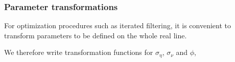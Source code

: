\documentclass{beamer}
\begin{document}
\begin{frame}[fragile]

\begin{knitrout}\small
{}\color{fgcolor}\begin{kframe}
\begin{alltt}
 \hlkwb{<-} 
\end{alltt}
\end{kframe}
\end{knitrout}

\begin{knitrout}\small
{}\color{fgcolor}\begin{kframe}
\begin{alltt}
 \hlkwb{<-} 

 \hlkwb{<-} 
\end{alltt}
\end{kframe}
\end{knitrout}


\end{frame}

\begin{frame}[fragile]

\frametitle{Parameter transformations}

\bi

\item For optimization procedures such as iterated filtering, it is convenient to transform parameters to be defined on the whole real line. 

\item We therefore write transformation functions for $\sigma_\eta$, $\sigma_\nu$ and $\phi$,

\ei

\begin{knitrout}\small
{}\color{fgcolor}\begin{kframe}
\begin{alltt}
 \hlkwb{<-} \hlstd{(}
  \hlstd{=}\hlstd{(}\hlstd{,}\hlstd{),}
  \hlstd{=}
\hlstd{)}
\end{alltt}
\end{kframe}
\end{knitrout}

\end{frame}
\end{document}
